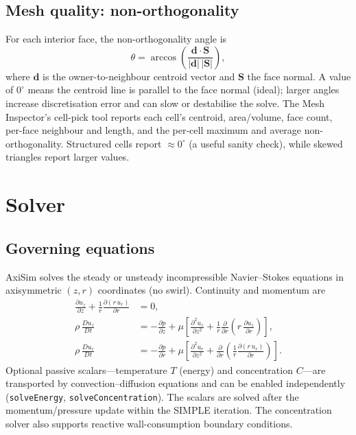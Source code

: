 \documentclass[11pt]{article}
\begin{document}
\subsection{Mesh quality: non-orthogonality}\label{sec:nonortho}
For each interior face, the non-orthogonality angle is
\begin{equation}
\theta = \arccos\!\left(\frac{\mathbf{d}\cdot\mathbf{S}}{\lvert\mathbf{d}\rvert\,\lvert\mathbf{S}\rvert}\right),
\end{equation}
where $\mathbf{d}$ is the owner-to-neighbour centroid vector and $\mathbf{S}$ the face
normal. A value of $0^\circ$ means the centroid line is parallel to the face normal
(ideal); larger angles increase discretisation error and can slow or destabilise the
solve. The Mesh Inspector's cell-pick tool reports each cell's centroid, area/volume,
face count, per-face neighbour and length, and the per-cell maximum and average
non-orthogonality. Structured cells report $\approx 0^\circ$ (a useful sanity check),
while skewed triangles report larger values.

\section{Solver}\label{sec:solver}
\subsection{Governing equations}
AxiSim solves the steady or unsteady incompressible Navier--Stokes equations in
axisymmetric \((z, r)\) coordinates (no swirl). Continuity and momentum are
\begin{align}
\frac{\partial u_z}{\partial z} + \frac{1}{r}\frac{\partial (r\,u_r)}{\partial r} &= 0, \\[4pt]
\rho\,\frac{D u_z}{Dt} &= -\frac{\partial p}{\partial z}
   + \mu\!\left[\frac{\partial^2 u_z}{\partial z^2} + \frac{1}{r}\frac{\partial}{\partial r}\!\left(r\,\frac{\partial u_z}{\partial r}\right)\right], \\[4pt]
\rho\,\frac{D u_r}{Dt} &= -\frac{\partial p}{\partial r}
   + \mu\!\left[\frac{\partial^2 u_r}{\partial z^2} + \frac{\partial}{\partial r}\!\left(\frac{1}{r}\frac{\partial (r\,u_r)}{\partial r}\right)\right].
\end{align}
Optional passive scalars---temperature \(T\) (energy) and concentration \(C\)---are
transported by convection--diffusion equations and can be enabled independently
(\texttt{solveEnergy}, \texttt{solveConcentration}). The scalars are solved after the
momentum/pressure update within the SIMPLE iteration. The concentration solver also
supports reactive wall-consumption boundary conditions.
\end{document}
